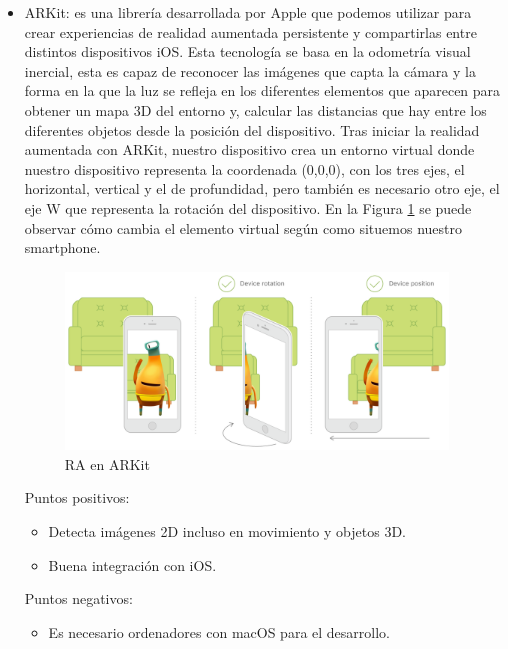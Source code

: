 \begin{itemize}
    \item ARKit\cite{arkit}: es una librería desarrollada por Apple que
    podemos utilizar para crear experiencias de realidad aumentada persistente y
    compartirlas entre distintos dispositivos iOS. 
    Esta tecnología se basa en la odometría visual inercial,
    esta es capaz de reconocer las imágenes que capta la cámara y la forma en
    la que la luz se refleja en los diferentes elementos que aparecen para
    obtener un mapa 3D del entorno y, calcular las distancias que hay entre los
    diferentes objetos desde la posición del dispositivo.
    Tras iniciar la realidad aumentada con ARKit,
    nuestro dispositivo crea un entorno virtual donde nuestro
    dispositivo representa la coordenada (0,0,0), con los tres ejes,
    el horizontal, vertical y el de profundidad, pero también es necesario
    otro eje, el eje W que representa la rotación del dispositivo. En la Figura
    \ref{fig:arkit} se puede observar cómo cambia el elemento virtual según como
    situemos nuestro smartphone.

    \begin{figure}[H]
        \centering
        \includegraphics[width=4in]{figures/chapter-2/arkit.png}
        \caption{RA en ARKit\cite{arkitimage}}
        \label{fig:arkit}
    \end{figure}

    Puntos positivos:
    \begin{itemize}
        \item Detecta imágenes 2D incluso en movimiento y objetos 3D.
        \item Buena integración con iOS.
    \end{itemize}
    Puntos negativos:
    \begin{itemize}
        \item Es necesario ordenadores con macOS para el desarrollo.
    \end{itemize}



\end{itemize}
